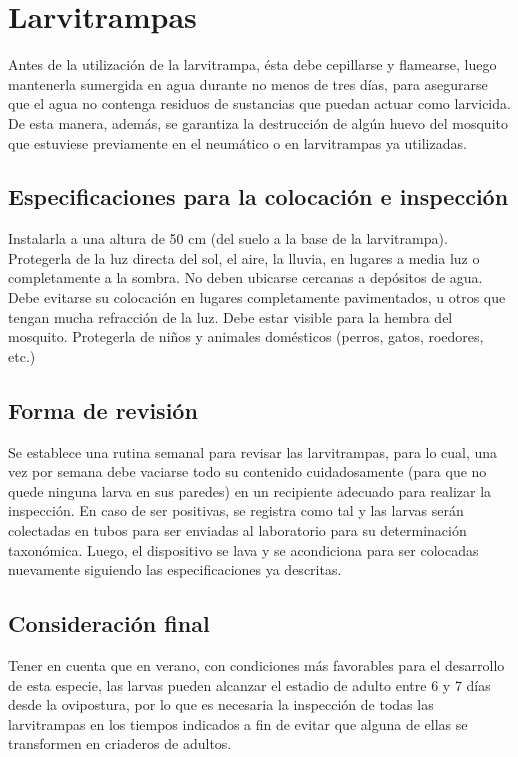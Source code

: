 \section{Larvitrampas}
\label{sec:densidad-vectorial-larvitrampas}
Antes de la utilización de la larvitrampa, ésta debe cepillarse y flamearse,
luego mantenerla sumergida en agua durante no menos de tres días, para
asegurarse que el agua no contenga residuos de sustancias que puedan actuar
como larvicida. De esta manera, además, se garantiza la destrucción de
algún huevo del mosquito que estuviese previamente en el neumático o en
larvitrampas ya utilizadas.

\subsection{Especificaciones para la colocación e inspección}
Instalarla a una altura de 50 cm (del suelo a la base de la larvitrampa).
Protegerla de la luz directa del sol, el aire, la lluvia, en lugares a
media luz o completamente a la sombra. No deben ubicarse cercanas a depósitos
de agua. Debe evitarse su colocación en lugares completamente pavimentados,
u otros que tengan mucha refracción de la luz. Debe estar visible para la
hembra del mosquito. Protegerla de niños y animales domésticos (perros,
gatos, roedores, etc.)

\subsection{Forma de revisión}
Se establece una rutina semanal para revisar las larvitrampas, para lo
cual, una vez por semana debe vaciarse todo su contenido cuidadosamente
(para que no quede ninguna larva en sus paredes) en un recipiente adecuado
para realizar la inspección. En caso de ser positivas, se registra como
tal y las larvas serán colectadas en tubos para ser enviadas al laboratorio
para su determinación taxonómica. Luego, el dispositivo se lava y se acondiciona
para ser colocadas nuevamente siguiendo las especificaciones ya descritas.

\subsection{Consideración final}
Tener en cuenta que en verano, con condiciones más favorables para el
desarrollo de esta especie, las larvas pueden alcanzar el estadio de
adulto entre 6 y 7 días desde la ovipostura, por lo que es necesaria la
inspección de todas las larvitrampas en los tiempos indicados a fin de
evitar que alguna de ellas se transformen en criaderos de adultos.
